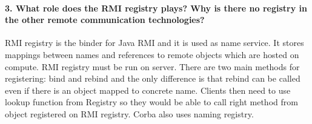 \documentclass{ds-report}
\begin{document}
	
	
	\paragraph{3. What role does the RMI registry plays? Why is there no registry in the other remote communication technologies? \newline}
	RMI registry is the binder for Java RMI and it is used as name service. It stores mappings between names and references to remote objects which
	are hosted on compute. RMI registry must be run on server. There are two main methods for registering: bind and rebind and the only difference is
	that rebind can be called even if there is an object mapped to concrete name. Clients then need to use lookup function from Registry so they would be
	able to call right method from object registered on RMI registry. Corba also uses naming registry.  
	
	
	\clearpage
	
	
\end{document}
